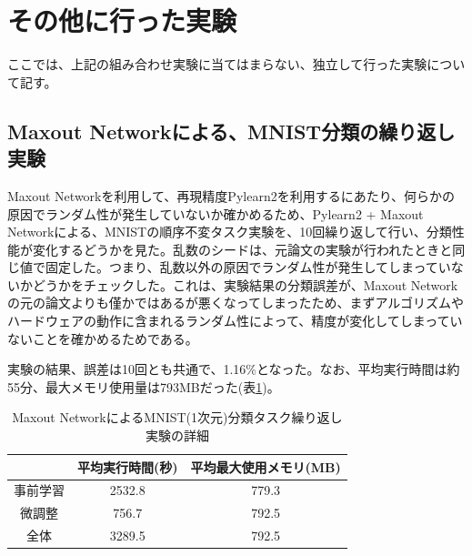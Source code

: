 \section{その他に行った実験}
ここでは、上記の組み合わせ実験に当てはまらない、独立して行った実験について記す。

\subsection{Maxout Networkによる、MNIST分類の繰り返し実験}
Maxout Networkを利用して、再現精度Pylearn2を利用するにあたり、何らかの原因でランダム性が発生していないか確かめるため、Pylearn2 + Maxout Networkによる、MNISTの順序不変タスク実験を、10回繰り返して行い、分類性能が変化するどうかを見た。乱数のシードは、元論文の実験が行われたときと同じ値で固定した。つまり、乱数以外の原因でランダム性が発生してしまっていないかどうかをチェックした。これは、実験結果の分類誤差が、Maxout Networkの元の論文よりも僅かではあるが悪くなってしまったため、まずアルゴリズムやハードウェアの動作に含まれるランダム性によって、精度が変化してしまっていないことを確かめるためである。\par
実験の結果、誤差は10回とも共通で、1.16\%となった。なお、平均実行時間は約55分、最大メモリ使用量は793MBだった(表\ref{c5_maxout_mnist1_stat})。\par

\begin{table}[tdp]
\caption{Maxout NetworkによるMNIST(1次元)分類タスク繰り返し実験の詳細}
\begin{center}
\begin{tabular}{|c|c|c|}\hline
 & 平均実行時間(秒) & 平均最大使用メモリ(MB) \\ \hline
事前学習 & 2532.8 & 779.3 \\ \hline
微調整 & 756.7 & 792.5 \\ \hline
全体 & 3289.5 & 792.5 \\ \hline
\end{tabular}
\end{center}
\label{c5_maxout_mnist1_stat}
\end{table}%

